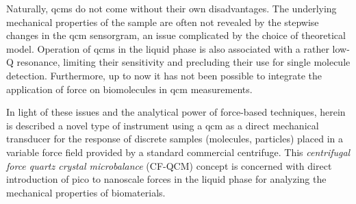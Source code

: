 Naturally, \glspl{qcm} do not come without their own disadvantages. The underlying
mechanical properties of the sample are often not revealed by the stepwise
changes in the \gls{qcm} sensorgram, an issue complicated by the choice of
theoretical model.  Operation of \glspl{qcm} in the liquid phase is also
associated with a rather low-Q resonance, limiting their sensitivity and
precluding their use for single molecule detection.  Furthermore, up to now
it has not been possible to integrate the application of force on
biomolecules in \gls{qcm} measurements.

In light of these issues and the analytical power of force-based
techniques, herein is described a novel type of instrument using a \gls{qcm} as a
direct mechanical transducer for the response of discrete samples
(molecules, particles) placed in a variable force field provided by a
standard commercial centrifuge.  This \textit{centrifugal force quartz
  crystal microbalance} (CF-QCM) concept is concerned with direct
introduction of pico to nanoscale forces in the liquid phase for analyzing
the mechanical properties of biomaterials.

